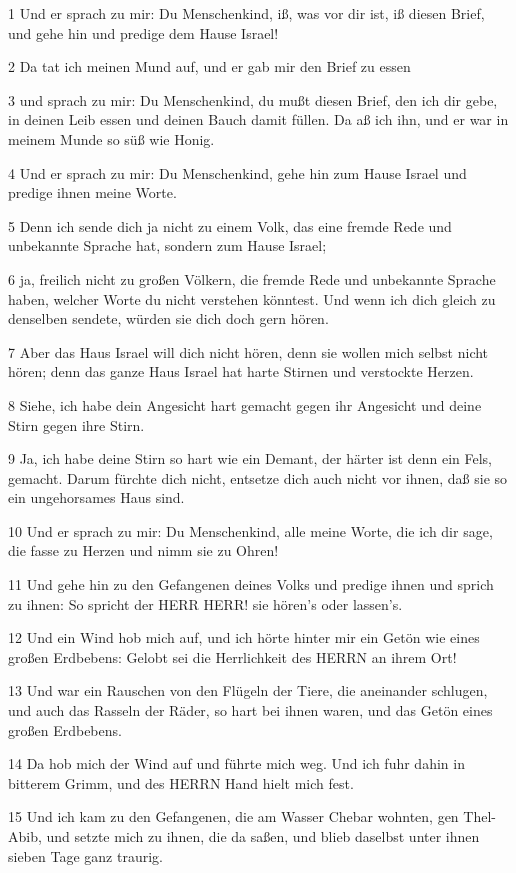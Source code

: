\par 1 Und er sprach zu mir: Du Menschenkind, iß, was vor dir ist, iß diesen Brief, und gehe hin und predige dem Hause Israel!
\par 2 Da tat ich meinen Mund auf, und er gab mir den Brief zu essen
\par 3 und sprach zu mir: Du Menschenkind, du mußt diesen Brief, den ich dir gebe, in deinen Leib essen und deinen Bauch damit füllen. Da aß ich ihn, und er war in meinem Munde so süß wie Honig.
\par 4 Und er sprach zu mir: Du Menschenkind, gehe hin zum Hause Israel und predige ihnen meine Worte.
\par 5 Denn ich sende dich ja nicht zu einem Volk, das eine fremde Rede und unbekannte Sprache hat, sondern zum Hause Israel;
\par 6 ja, freilich nicht zu großen Völkern, die fremde Rede und unbekannte Sprache haben, welcher Worte du nicht verstehen könntest. Und wenn ich dich gleich zu denselben sendete, würden sie dich doch gern hören.
\par 7 Aber das Haus Israel will dich nicht hören, denn sie wollen mich selbst nicht hören; denn das ganze Haus Israel hat harte Stirnen und verstockte Herzen.
\par 8 Siehe, ich habe dein Angesicht hart gemacht gegen ihr Angesicht und deine Stirn gegen ihre Stirn.
\par 9 Ja, ich habe deine Stirn so hart wie ein Demant, der härter ist denn ein Fels, gemacht. Darum fürchte dich nicht, entsetze dich auch nicht vor ihnen, daß sie so ein ungehorsames Haus sind.
\par 10 Und er sprach zu mir: Du Menschenkind, alle meine Worte, die ich dir sage, die fasse zu Herzen und nimm sie zu Ohren!
\par 11 Und gehe hin zu den Gefangenen deines Volks und predige ihnen und sprich zu ihnen: So spricht der HERR HERR! sie hören's oder lassen's.
\par 12 Und ein Wind hob mich auf, und ich hörte hinter mir ein Getön wie eines großen Erdbebens: Gelobt sei die Herrlichkeit des HERRN an ihrem Ort!
\par 13 Und war ein Rauschen von den Flügeln der Tiere, die aneinander schlugen, und auch das Rasseln der Räder, so hart bei ihnen waren, und das Getön eines großen Erdbebens.
\par 14 Da hob mich der Wind auf und führte mich weg. Und ich fuhr dahin in bitterem Grimm, und des HERRN Hand hielt mich fest.
\par 15 Und ich kam zu den Gefangenen, die am Wasser Chebar wohnten, gen Thel-Abib, und setzte mich zu ihnen, die da saßen, und blieb daselbst unter ihnen sieben Tage ganz traurig.

